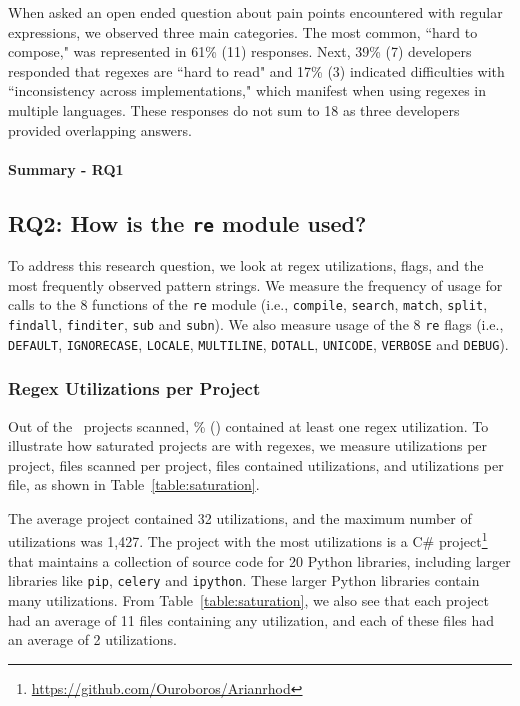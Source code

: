 When asked an open ended question about pain points encountered with regular expressions, we observed three main categories. The most common, ``hard to compose," was represented in 61\% (11) responses. Next, 
 39\% (7) developers responded that regexes are ``hard to read" and 17\% (3) indicated difficulties with ``inconsistency across implementations," which manifest when using regexes in multiple languages. These responses do not sum to 18 as three developers provided overlapping  answers.

\paragraph{Summary - RQ1}


\subsection{RQ2: How  is the {\tt re} module used?}
To address this research question, we look at regex utilizations, flags, and the most frequently observed pattern strings.
We measure the frequency of usage for calls to the 8 functions of the {\tt re} module (i.e., {\tt compile}, {\tt search}, {\tt match}, {\tt split}, {\tt findall}, {\tt finditer}, {\tt sub} and {\tt subn}).
We also measure usage of the 8 {\tt re} flags (i.e., {\tt DEFAULT}, {\tt IGNORECASE}, {\tt LOCALE}, {\tt MULTILINE}, {\tt DOTALL}, {\tt UNICODE}, {\tt VERBOSE} and {\tt DEBUG}).



\subsubsection{Regex Utilizations per Project}
Out of the \ projects scanned, \% () contained at least one regex utilization.  To illustrate how saturated projects are with regexes, we measure utilizations per project, files scanned per project, files contained utilizations, and  utilizations  per file, as shown in Table~\ref{table:saturation}.

The average project contained 32 utilizations, and the maximum number of utilizations was 1,427.  The project with the most utilizations is a C\# project\footnote{\url{https://github.com/Ouroboros/Arianrhod}} that maintains a collection of source code for 20 Python libraries, including larger libraries like {\tt pip}, {\tt celery} and {\tt ipython}.  These larger Python libraries contain many utilizations.
From Table~\ref{table:saturation}, we also see that each project had an average of 11 files containing any utilization, and each of these files had an average of 2 utilizations.


